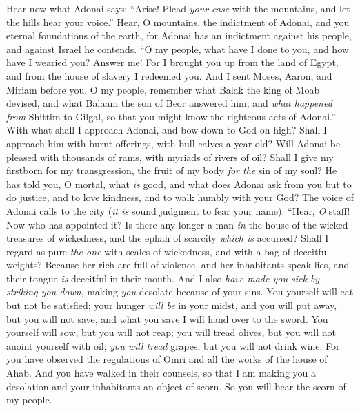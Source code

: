 \begin{biblechapter} %
 Hear now what Adonai says: 
“Arise! Plead \textit{your case} with the mountains, 
and let the hills hear your voice.”
\verse Hear, O mountains, the indictment of Adonai, 
and you eternal foundations of the earth, 
for Adonai has an indictment against his people, 
and against Israel he contends.
\verse “O my people, what have I done to you, 
and how have I wearied you? Answer me!
\verse For I brought you up from the land of Egypt, 
and from the house of slavery I redeemed you. 
And I sent Moses, Aaron, and Miriam before you.
\verse O my people, remember what Balak the king of Moab devised, 
and what Balaam the son of Beor answered him, 
and \textit{what happened from} Shittim to Gilgal, 
so that you might know the righteous acts of Adonai.”
 With what shall I approach Adonai, 
and bow down to God on high? 
Shall I approach him with burnt offerings, 
with bull calves a year old?
\verse Will Adonai be pleased with thousands of rams, 
with myriads of rivers of oil? 
Shall I give my firstborn for my transgression, 
the fruit of my body \textit{for the} sin of my soul?
\verse He has told you, O mortal, what \textit{is} good, 
and what does Adonai ask from you 
but to do justice, and to love kindness, 
and to walk humbly with your God?
 The voice of Adonai calls to the city 
(\textit{it is} sound judgment to fear your name): 
“Hear, \textit{O} staff! Now who has appointed it?
\verse Is there any longer a man \textit{in} the house of the wicked 
treasures of wickedness, 
and the ephah of scarcity \textit{which is} accursed?
\verse Shall I regard as pure \textit{the one} with scales of wickedness, 
and with a bag of deceitful weights?
\verse Because her rich are full of violence, 
and her inhabitants speak lies, 
and their tongue \textit{is} deceitful in their mouth.
\verse And I also \textit{have made you sick by striking you down}, 
making \textit{you} desolate because of your sins.
\verse You yourself will eat but not be satisfied; 
your hunger \textit{will be} in your midst, 
and you will put away, but you will not save, 
and what you save I will hand over to the sword.
\verse You yourself will sow, but you will not reap; 
you will tread olives, but you will not anoint yourself with oil; 
\textit{you will tread} grapes, but you will not drink wine.
\verse For you have observed the regulations of Omri 
and all the works of the house of Ahab. 
And you have walked in their counsels, 
so that I am making you a desolation 
and your inhabitants an object of scorn. 
So you will bear the scorn of my people.
\end{biblechapter}

